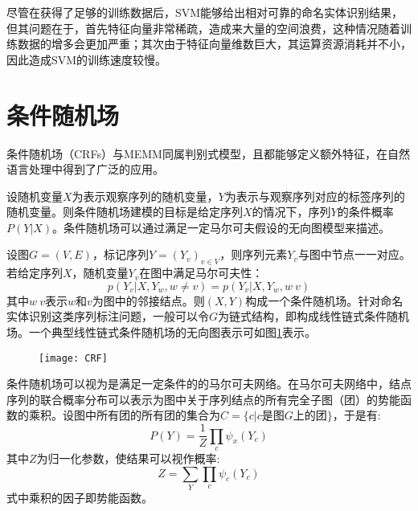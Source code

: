 尽管在获得了足够的训练数据后，SVM能够给出相对可靠的命名实体识别结果，但其问题在于，首先特征向量非常稀疏，造成来大量的空间浪费，这种情况随着训练数据的增多会更加严重；其次由于特征向量维数巨大，其运算资源消耗并不小，因此造成SVM的训练速度较慢。

\section{条件随机场}
条件随机场（CRFs）与MEMM同属判别式模型，且都能够定义额外特征，在自然语言处理中得到了广泛的应用。

设随机变量$X$为表示观察序列的随机变量，$Y$为表示与观察序列对应的标签序列的随机变量。则条件随机场建模的目标是给定序列$X$的情况下，序列$Y$的条件概率$P(Y|X)$。条件随机场可以通过满足一定马尔可夫假设的无向图模型来描述。

设图$G=(V,E)$，标记序列$Y = (Y_v)_{v\in V}$，则序列元素$Y_v$与图中节点一一对应。若给定序列$X$，随机变量$Y_v$在图中满足马尔可夫性：
\begin{equation}
    p(Y_v|X, Y_w, w\neq v) = p(Y_v|X,Y_w,w~v)
    \label{eq:Markov-in-CRF}
\end{equation}
其中$w~v$表示$w$和$v$为图中的邻接结点。则$(X, Y)$构成一个条件随机场。针对命名实体识别这类序列标注问题，一般可以令$G$为链式结构，即构成线性链式条件随机场。一个典型线性链式条件随机场的无向图表示可如图\ref{fig:CRF}表示。

\begin{figure}[H]
    \centering
    \texttt{[image: CRF]}
    \label{fig:CRF}
\end{figure}

条件随机场可以视为是满足一定条件的的马尔可夫网络。在马尔可夫网络中，结点序列的联合概率分布可以表示为图中关于序列结点的所有完全子图（团）的势能函数的乘积。设图中所有团的所有团的集合为$C = \{c|c$是图$G$上的团$\}$，于是有:
\begin{equation}
    P(Y) = \frac{1}{Z}\prod_{c}\psi_x(Y_c)
\end{equation}
其中$Z$为归一化参数，使结果可以视作概率:
\begin{equation}
    Z = \sum_Y\prod_c \psi_c(Y_c)
\end{equation}
式中乘积的因子即势能函数。


